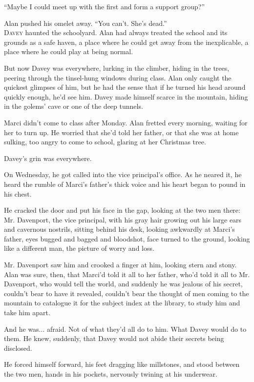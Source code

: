 ``Maybe I could meet up with the first and form a support group?''

Alan pushed his omelet away.  ``You can't.  She's dead.''
\\
\lettrine[lines=3, lhang=.5, nindent=0pt, findent=2pt]{D}{avey} haunted the schoolyard.  Alan had always treated the school and
its grounds as a safe haven, a place where he could get away from the
inexplicable, a place where he could play at being normal.

But now Davey was everywhere, lurking in the climber, hiding in the
trees, peering through the tinsel-hung windows during class.  Alan
only caught the quickest glimpses of him, but he had the sense that if
he turned his head around quickly enough, he'd see him.  Davey made
himself scarce in the mountain, hiding in the golems' cave or one of
the deep tunnels.

Marci didn't come to class after Monday.  Alan fretted every morning,
waiting for her to turn up.  He worried that she'd told her father, or
that she was at home sulking, too angry to come to school, glaring at
her Christmas tree.

Davey's grin was everywhere.

On Wednesday, he got called into the vice principal's office.  As he
neared it, he heard the rumble of Marci's father's thick voice and his
heart began to pound in his chest.

He cracked the door and put his face in the gap, looking at the two
men there:  Mr.  Davenport, the vice principal, with his gray hair
growing out his large ears and cavernous nostrils, sitting behind his
desk, looking awkwardly at Marci's father, eyes bugged and bagged and
bloodshot, face turned to the ground, looking like a different man,
the picture of worry and loss.

Mr.  Davenport saw him and crooked a finger at him, looking stern and
stony.  Alan was sure, then, that Marci'd told it all to her father,
who'd told it all to Mr.  Davenport, who would tell the world, and
suddenly he was jealous of his secret, couldn't bear to have it
revealed, couldn't bear the thought of men coming to the mountain to
catalogue it for the subject index at the library, to study him and
take him apart.

And he was...  afraid.  Not of what they'd all do to him.  What Davey
would do to them.  He knew, suddenly, that Davey would not abide their
secrets being disclosed.

He forced himself forward, his feet dragging like millstones, and
stood between the two men, hands in his pockets, nervously twining at
his underwear.


